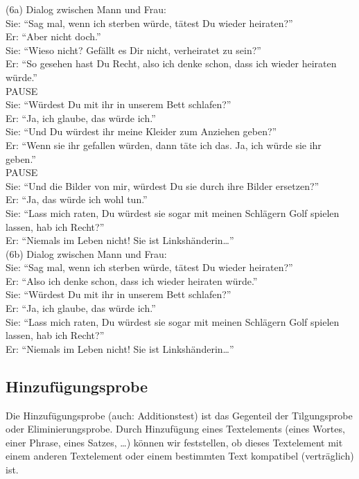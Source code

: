 \documentclass[
  letterpaper,
]{scrbook}
\begin{document}
(6a) Dialog zwischen Mann und Frau:\\
Sie: ``Sag mal, wenn ich sterben würde, tätest Du wieder heiraten?''\\
Er: ``Aber nicht doch.''\\
Sie: ``Wieso nicht? Gefällt es Dir nicht, verheiratet zu sein?''\\
Er: ``So gesehen hast Du Recht, also ich denke schon, dass ich wieder
heiraten würde.''\\
PAUSE\\
Sie: ``Würdest Du mit ihr in unserem Bett schlafen?''\\
Er: ``Ja, ich glaube, das würde ich.''\\
Sie: ``Und Du würdest ihr meine Kleider zum Anziehen geben?''\\
Er: ``Wenn sie ihr gefallen würden, dann täte ich das. Ja, ich würde sie
ihr geben.''\\
PAUSE\\
Sie: ``Und die Bilder von mir, würdest Du sie durch ihre Bilder
ersetzen?''\\
Er: ``Ja, das würde ich wohl tun.''\\
Sie: ``Lass mich raten, Du würdest sie sogar mit meinen Schlägern Golf
spielen lassen, hab ich Recht?''\\
Er: ``Niemals im Leben nicht! Sie ist Linkshänderin\ldots{}''\\

(6b) Dialog zwischen Mann und Frau:\\
Sie: ``Sag mal, wenn ich sterben würde, tätest Du wieder heiraten?''\\
Er: ``Also ich denke schon, dass ich wieder heiraten würde.''\\
Sie: ``Würdest Du mit ihr in unserem Bett schlafen?''\\
Er: ``Ja, ich glaube, das würde ich.''\\
Sie: ``Lass mich raten, Du würdest sie sogar mit meinen Schlägern Golf
spielen lassen, hab ich Recht?''\\
Er: ``Niemals im Leben nicht! Sie ist Linkshänderin\ldots{}''\\

\hypertarget{hinzufuxfcgungsprobe}{%
\subsection{Hinzufügungsprobe}\label{hinzufuxfcgungsprobe}}

Die Hinzufügungsprobe (auch: Additionstest) ist das Gegenteil der
Tilgungsprobe oder Eliminierungsprobe. Durch Hinzufügung eines
Textelements (eines Wortes, einer Phrase, eines Satzes, \ldots) können
wir feststellen, ob dieses Textelement mit einem anderen Textelement
oder einem bestimmten Text kompatibel (verträglich) ist.
\end{document}
